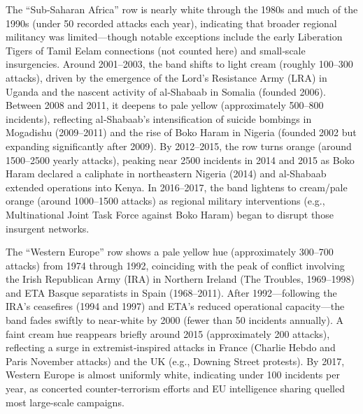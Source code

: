 The “Sub‐Saharan Africa” row is nearly white through the 1980s and much of the 1990s (under 50 recorded attacks each year), indicating that broader regional militancy was limited—though notable exceptions include the early Liberation Tigers of Tamil Eelam connections (not counted here) and small‐scale insurgencies. Around 2001–2003, the band shifts to light cream (roughly 100–300 attacks), driven by the emergence of the Lord’s Resistance Army (LRA) in Uganda and the nascent activity of al‐Shabaab in Somalia (founded 2006). Between 2008 and 2011, it deepens to pale yellow (approximately 500–800 incidents), reflecting al‐Shabaab’s intensification of suicide bombings in Mogadishu (2009–2011) and the rise of Boko Haram in Nigeria (founded 2002 but expanding significantly after 2009). By 2012–2015, the row turns orange (around 1500–2500 yearly attacks), peaking near 2500 incidents in 2014 and 2015 as Boko Haram declared a caliphate in northeastern Nigeria (2014) and al‐Shabaab extended operations into Kenya. In 2016–2017, the band lightens to cream/pale orange (around 1000–1500 attacks) as regional military interventions (e.g., Multinational Joint Task Force against Boko Haram) began to disrupt those insurgent networks.

The “Western Europe” row shows a pale yellow hue (approximately 300–700 attacks) from 1974 through 1992, coinciding with the peak of conflict involving the Irish Republican Army (IRA) in Northern Ireland (The Troubles, 1969–1998) and ETA Basque separatists in Spain (1968–2011). After 1992—following the IRA’s ceasefires (1994 and 1997) and ETA’s reduced operational capacity—the band fades swiftly to near-white by 2000 (fewer than 50 incidents annually). A faint cream hue reappears briefly around 2015 (approximately 200 attacks), reflecting a surge in extremist‐inspired attacks in France (Charlie Hebdo and Paris November attacks) and the UK (e.g., Downing Street protests). By 2017, Western Europe is almost uniformly white, indicating under 100 incidents per year, as concerted counter‐terrorism efforts and EU intelligence sharing quelled most large-scale campaigns.

